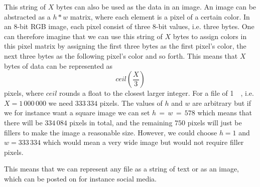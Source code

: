 This string of $X$ bytes can also be used as the data in an image. An image can be abstracted as a $h * w$ matrix, where each element is a pixel of a certain color. In an 8-bit RGB image, each pixel consist of three 8-bit values, i.e. three bytes. One can therefore imagine that we can use this string of $X$ bytes to assign colors in this pixel matrix by assigning the first three bytes as the first pixel's color, the next three bytes as the following pixel's color and so forth. This means that $X$ bytes of data can be represented as 
$$ceil(\frac{X}{3})$$ 
pixels, where $ceil$ rounds a float to the closest larger integer. For a file of \SI{1}{\mega\byte}, i.e. $X = 1\,000\,000$ we need $333\,334$ pixels. The values of $h$ and $w$ are arbitrary but if we for instance want a square image we can set $ h\,=\,w\,=\,578$ which means that there will be $334\,084$ pixels in total, and the remaining $750$ pixels will just be fillers to make the image a reasonable size. However, we could choose $h = 1$ and $w = 333\,334$ which would mean a very wide image but would not require filler pixels. 

This means that we can represent any file as a string of text or as an image, which can be posted on for instance social media. 

